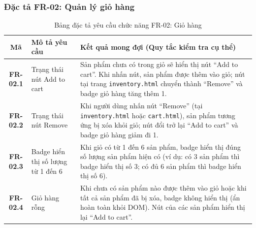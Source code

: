 \documentclass[a4paper]{article}
\begin{document}
\subsubsection{Đặc tả FR-02: Quản lý giỏ hàng}
\begin{table}[H]
\centering
\small
\begin{tabularx}{\textwidth}{|c|p{4.5cm}|X|}
\hline
\textbf{Mã} & \textbf{Mô tả yêu cầu} & \textbf{Kết quả mong đợi (Quy tắc kiểm tra cụ thể)} \\ \hline
\textbf{FR-02.1} & Trạng thái nút Add to cart & Sản phẩm chưa có trong giỏ sẽ hiển thị nút ``Add to cart''. Khi nhấn nút, sản phẩm được thêm vào giỏ; nút tại trang \texttt{inventory.html} chuyển thành ``Remove'' và badge giỏ hàng tăng thêm 1. \\ \hline
\textbf{FR-02.2} & Trạng thái nút Remove & Khi người dùng nhấn nút ``Remove'' (tại \texttt{inventory.html} hoặc \texttt{cart.html}), sản phẩm tương ứng bị xóa khỏi giỏ; nút đổi trở lại ``Add to cart'' và badge giỏ hàng giảm đi 1. \\ \hline
\textbf{FR-02.3} & Badge hiển thị số lượng từ 1 đến 6 & Khi giỏ có từ 1 đến 6 sản phẩm, badge hiển thị đúng số lượng sản phẩm hiện có (ví dụ: có 3 sản phẩm thì badge hiển thị số 3; có đủ 6 sản phẩm thì badge hiển thị số 6). \\ \hline
\textbf{FR-02.4} & Giỏ hàng rỗng & Khi chưa có sản phẩm nào được thêm vào giỏ hoặc khi tất cả sản phẩm đã bị xóa, badge không hiển thị (ẩn hoàn toàn khỏi DOM). Nút của các sản phẩm hiển thị lại ``Add to cart''. \\ \hline
\end{tabularx}
\caption{Bảng đặc tả yêu cầu chức năng FR-02: Giỏ hàng}
\end{table}

\clearpage
\end{document}
